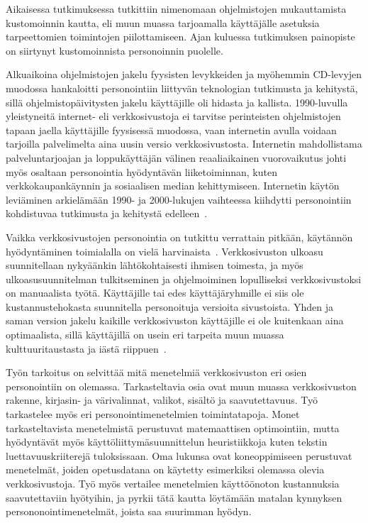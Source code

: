 \documentclass[finnish, 12pt, a4paper, elec, utf8, a-1b, online]{aaltothesis}
\begin{document}
Aikaisessa tutkimuksessa tutkittiin nimenomaan ohjelmistojen mukauttamista
kustomoinnin kautta, eli muun muassa tarjoamalla käyttäjälle asetuksia
tarpeettomien toimintojen piilottamiseen. Ajan kuluessa tutkimuksen painopiste
on siirtynyt kustomoinnista personoinnin puolelle.

Alkuaikoina ohjelmistojen jakelu fyysisten levykkeiden ja myöhemmin CD-levyjen
muodossa hankaloitti personointiin liittyvän teknologian tutkimusta ja
kehitystä, sillä ohjelmistopäivitysten jakelu käyttäjille oli hidasta ja
kallista. 1990-luvulla yleistyneitä internet- eli verkkosivustoja ei tarvitse
perinteisten ohjelmistojen tapaan jaella käyttäjille fyysisessä muodossa, vaan
internetin avulla voidaan tarjoilla palvelimelta aina uusin versio
verkkosivustosta. Internetin mahdollistama palveluntarjoajan ja loppukäyttäjän
välinen reaaliaikainen vuorovaikutus johti myös osaltaan personointia
hyödyntävän liiketoiminnan, kuten verkkokaupankäynnin ja sosiaalisen median
kehittymiseen. Internetin käytön leviäminen arkielämään 1990- ja 2000-lukujen
vaihteessa kiihdytti personointiin kohdistuvaa tutkimusta ja
kehitystä edelleen~\cite{10.1108/03090560710737534}.

Vaikka verkkosivustojen personointia on tutkittu verrattain pitkään, käytännön
hyödyntäminen toimialalla on vielä harvinaista~\cite{viite puuttuu}.
Verkkosivuston ulkoasu suunnitellaan nykyäänkin lähtökohtaisesti ihmisen toimesta,
ja myös ulkoasusuunnitelman tulkitseminen ja ohjelmoiminen lopulliseksi
verkkosivustoksi on manuaalista työtä. Käyttäjille tai edes käyttäjäryhmille ei
siis ole kustannustehokasta suunnitella personoituja versioita sivustoista.
Yhden ja saman version jakelu kaikille verkkosivuston käyttäjille ei ole
kuitenkaan aina optimaalista, sillä käyttäjillä on usein eri tarpeita muun
muassa kulttuuritaustasta ja iästä riippuen~\cite{viite puuttuu}.

Työn tarkoitus on selvittää mitä menetelmiä verkkosivuston eri osien
personointiin on olemassa. Tarkasteltavia osia ovat muun muassa verkkosivuston
rakenne, kirjasin- ja värivalinnat, valikot, sisältö ja saavutettavuus. Työ
tarkastelee myös eri personointimenetelmien toimintatapoja. Monet
tarkasteltavista menetelmistä perustuvat matemaattisen optimointiin, mutta
hyödyntävät myös käyttöliittymäsuunnittelun heuristiikkoja kuten tekstin
luettavuuskriiterejä tuloksissaan. Oma lukunsa ovat koneoppimiseen perustuvat
menetelmät, joiden opetusdatana on käytetty esimerkiksi olemassa olevia
verkkosivustoja. Työ myös vertailee menetelmien käyttöönoton kustannuksia
saavutettaviin hyötyihin, ja pyrkii tätä kautta löytämään matalan kynnyksen
persononointimenetelmät, joista saa suurimman hyödyn.
\end{document}
